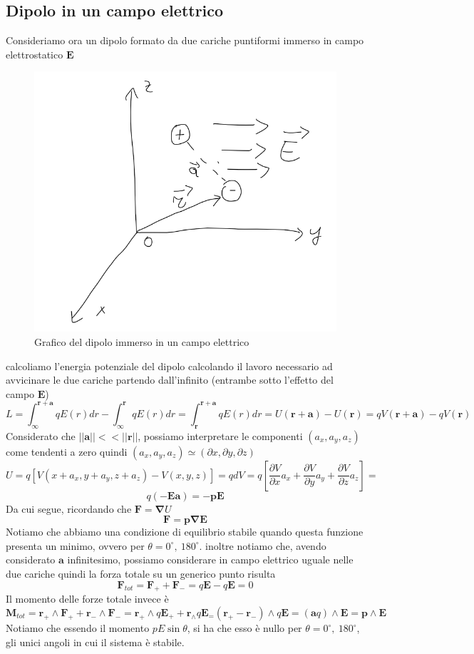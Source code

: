 \documentclass[10pt,a4paper]{article}
\begin{document}
\subsection{Dipolo in un campo elettrico}
Consideriamo ora un dipolo formato da due cariche puntiformi immerso in campo elettrostatico $\mathbf{E}$
\begin{figure}[h!]
	\centering
	\includegraphics[width=0.5\linewidth]{images/dipolo_campo_elettrico}
	\caption{Grafico del dipolo immerso in un campo elettrico}
	\label{fig:dipolocampoelettrico}
\end{figure}
\FloatBarrier
calcoliamo l'energia potenziale del dipolo calcolando il lavoro necessario ad avvicinare le due cariche partendo dall'infinito (entrambe sotto l'effetto del campo $\mathbf{E}$)
\[L = \int_{\infty}^{\mathbf{r}+\mathbf{a}} qE(r) dr -\int_{\infty}^{\mathbf{r}} qE(r) dr =\int_{\mathbf{r}}^{\mathbf{r}+\mathbf{a}} qE(r) dr= U(\mathbf{r}+\mathbf{a})-U(\mathbf{r}) = qV(\mathbf{r}+\mathbf{a})-qV(\mathbf{r})\]
Considerato che $||\mathbf{a}||<<||\mathbf{r}||$, possiamo interpretare le componenti \((a_x, a_y, a_z)\) come tendenti a zero quindi \((a_x, a_y, a_z)\simeq (\partial x, \partial y, \partial z)\)
\[U = q[V(x+a_x, y+a_y, z+a_z)-V(x, y, z)] = qdV = q\left[\frac{\partial V}{\partial x} a_x + \frac{\partial V}{\partial y}a_y + \frac{\partial V}{\partial z}a_z\right] =\]
\[ q(-\mathbf{E}\mathbf{a}) = -\mathbf{p}\mathbf{E}\]
Da cui segue, ricordando che \(\mathbf{F} = \mathbf{\nabla} U\)
\[\mathbf{F} = \mathbf{p}\mathbf{\nabla}\mathbf{E}\]
Notiamo che abbiamo una condizione di equilibrio stabile quando questa funzione presenta un minimo, ovvero per \(\theta= 0^\circ,\ 180^\circ\). inoltre notiamo che, avendo considerato $\mathbf{a}$ infinitesimo, possiamo considerare in campo elettrico uguale nelle due cariche quindi la forza totale su un generico punto risulta 
\[\mathbf{F}_{tot} =\mathbf{F}_++\mathbf{F}_- = q\mathbf{E}-q\mathbf{E} = 0\]
Il momento delle forze totale invece è
\[\mathbf{M}_{tot} = \mathbf{r}_+\wedge\mathbf{F}_+ + \mathbf{r}_-\wedge\mathbf{F}_- = \mathbf{r}_+\wedge q\mathbf{E}_+ + \mathbf{r}_\wedge q\mathbf{E}_ = (\mathbf{r}_+ - \mathbf{r}_-)\wedge q \mathbf{E} = (\mathbf{a}q)\wedge\mathbf{E} = \mathbf{p}\wedge\mathbf{E}\]
Notiamo che essendo il momento \(pE\sin\theta\), si ha che esso è nullo per \(\theta= 0^\circ,\ 180^\circ\), gli unici angoli in cui il sistema è stabile. 
\end{document}
